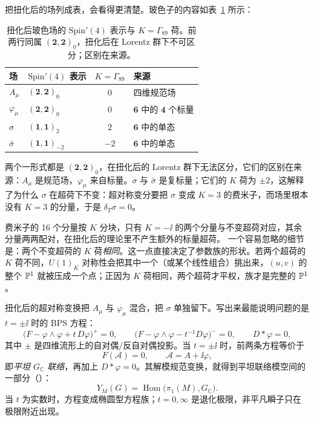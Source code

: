 把扭化后的场列成表，会看得更清楚。玻色子的内容如表~\ref{tab:bosons} 所示：
\begin{table}[htbp]
\centering
\caption{扭化后玻色场的 $\mathrm{Spin}'(4)$ 表示与 $K=\Gamma_{89}$ 荷。前两行同属 $(\mathbf 2,\mathbf 2)_0$，扭化后在 Lorentz 群下不可区分；区别在来源。}
\label{tab:bosons}
\begin{tabular}{@{}llcl@{}}
\toprule
场 & $\mathrm{Spin}'(4)$ 表示 & $K=\Gamma_{89}$ & 来源 \\
\midrule
$A_\mu$ & $(\mathbf 2,\mathbf 2)_0$ & $0$ & 四维规范场 \\
$\varphi_\mu$ & $(\mathbf 2,\mathbf 2)_0$ & $0$ & $\mathbf 6$ 中的 $\mathbf 4$ 个标量 \\
$\sigma$ & $(\mathbf 1,\mathbf 1)_2$ & $2$ & $\mathbf 6$ 中的单态 \\
$\bar\sigma$ & $(\mathbf 1,\mathbf 1)_{-2}$ & $-2$ & $\mathbf 6$ 中的单态 \\
\bottomrule
\end{tabular}
\end{table}
 两个一形式都是 $(\mathbf 2,\mathbf 2)_0$，在扭化后的 Lorentz 群下无法区分，它们的区别在来源：$A_\mu$ 是规范场，$\varphi_\mu$ 来自标量。$\sigma$ 与 $\bar\sigma$ 是复标量；它们的 $K$ 荷为 $\pm2$，这解释了为什么 $\sigma$ 在超荷下不变：超对称变分要把 $\sigma$ 变成 $K=3$ 的费米子，而场里根本没有 $K=3$ 的分量，于是 $\delta_T\sigma=0$。

费米子的 16 个分量按 $K$ 分块，只有 $K=-\ii$ 的两个分量与不变超荷对应，其余分量两两配对，在扭化后的理论里不产生额外的标量超荷。 一个容易忽略的细节是：两个不变超荷的 $K$ 荷\emph{相同}。这一点直接决定了参数族的形状。若两个超荷的 $K$ 荷不同，$U(1)_K$ 对称性会把其中一个（或某个线性组合）挑出来，$(u,v)$ 的整个 $\mathbb{P}^1$ 就被压成一个点；正因为 $K$ 荷相同，两个超荷才平权，族才是完整的 $\mathbb{P}^1$。

扭化后的超对称变换把 $A_\mu$ 与 $\varphi_\mu$ 混合，把 $\sigma$ 单独留下。写出来最能说明问题的是 $t=\pm\ii$ 时的 BPS 方程：
\begin{equation}
\bigl(F-\varphi\wedge\varphi+t\,D\varphi\bigr)^+=0,\qquad
\bigl(F-\varphi\wedge\varphi-t^{-1}D\varphi\bigr)^-=0,\qquad
D{*}\varphi=0,
\label{eq:bps}
\end{equation}
其中 $\pm$ 是四维流形上的自对偶/反自对偶投影。当 $t=\pm\ii$ 时，前两条方程等价于
\begin{equation}
F(\mathcal A)=0,\qquad \mathcal A=A+\ii\varphi,
\label{eq:flat}
\end{equation}
即\emph{平坦 $G_{\mathbb C}$ 联络}，再加上 $D{*}\varphi=0$。其解模规范变换，就得到平坦联络模空间的一部分（）：
\begin{equation}
Y_M(G)=\operatorname{Hom}\bigl(\pi_1(M),G_{\mathbb C}\bigr).
\label{eq:flatmoduli}
\end{equation}
当 $t$ 为实数时，方程变成椭圆型方程族；$t=0,\infty$ 是退化极限，非平凡瞬子只在极限附近出现。

